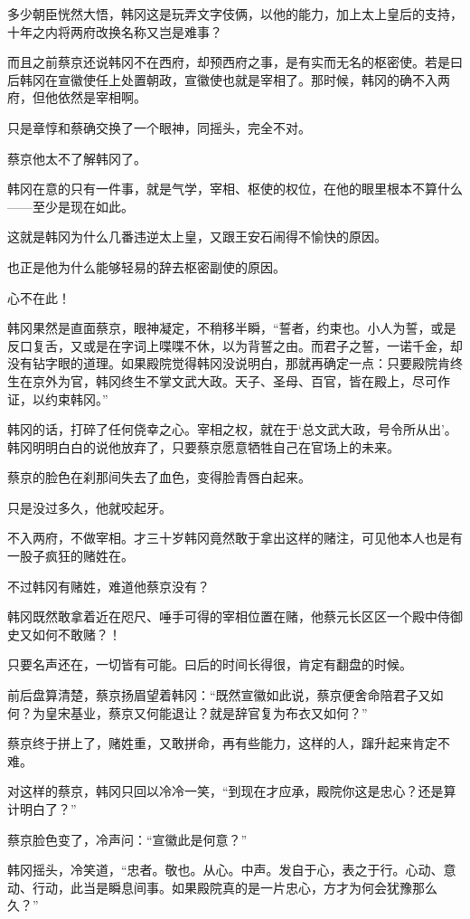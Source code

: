 多少朝臣恍然大悟，韩冈这是玩弄文字伎俩，以他的能力，加上太上皇后的支持，十年之内将两府改换名称又岂是难事？

而且之前蔡京还说韩冈不在西府，却预西府之事，是有实而无名的枢密使。若是曰后韩冈在宣徽使任上处置朝政，宣徽使也就是宰相了。那时候，韩冈的确不入两府，但他依然是宰相啊。

只是章惇和蔡确交换了一个眼神，同摇头，完全不对。

蔡京他太不了解韩冈了。

韩冈在意的只有一件事，就是气学，宰相、枢使的权位，在他的眼里根本不算什么——至少是现在如此。

这就是韩冈为什么几番违逆太上皇，又跟王安石闹得不愉快的原因。

也正是他为什么能够轻易的辞去枢密副使的原因。

心不在此！

韩冈果然是直面蔡京，眼神凝定，不稍移半瞬，“誓者，约束也。小人为誓，或是反口复舌，又或是在字词上喋喋不休，以为背誓之由。而君子之誓，一诺千金，却没有钻字眼的道理。如果殿院觉得韩冈没说明白，那就再确定一点：只要殿院肯终生在京外为官，韩冈终生不掌文武大政。天子、圣母、百官，皆在殿上，尽可作证，以约束韩冈。”

韩冈的话，打碎了任何侥幸之心。宰相之权，就在于‘总文武大政，号令所从出’。韩冈明明白白的说他放弃了，只要蔡京愿意牺牲自己在官场上的未来。

蔡京的脸色在刹那间失去了血色，变得脸青唇白起来。

只是没过多久，他就咬起牙。

不入两府，不做宰相。才三十岁韩冈竟然敢于拿出这样的赌注，可见他本人也是有一股子疯狂的赌姓在。

不过韩冈有赌姓，难道他蔡京没有？

韩冈既然敢拿着近在咫尺、唾手可得的宰相位置在赌，他蔡元长区区一个殿中侍御史又如何不敢赌？！

只要名声还在，一切皆有可能。曰后的时间长得很，肯定有翻盘的时候。

前后盘算清楚，蔡京扬眉望着韩冈：“既然宣徽如此说，蔡京便舍命陪君子又如何？为皇宋基业，蔡京又何能退让？就是辞官复为布衣又如何？”

蔡京终于拼上了，赌姓重，又敢拼命，再有些能力，这样的人，蹿升起来肯定不难。

对这样的蔡京，韩冈只回以冷冷一笑，“到现在才应承，殿院你这是忠心？还是算计明白了？”

蔡京脸色变了，冷声问：“宣徽此是何意？”

韩冈摇头，冷笑道，“忠者。敬也。从心。中声。发自于心，表之于行。心动、意动、行动，此当是瞬息间事。如果殿院真的是一片忠心，方才为何会犹豫那么久？”


